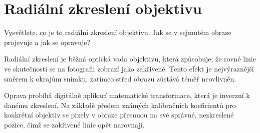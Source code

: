 \section{Radiální zkreslení objektivu}
Vysvětlete, co je to radiální zkreslení objektivu. Jak se v sejmutém obraze projevuje a jak se opravuje?

Radiální zkreslení je běžná optická vada objektivu, která způsobuje, že rovné linie ve skutečnosti se na fotografii 
zobrazí jako zakřivené. Tento efekt je nejvýraznější směrem k okrajům snímku, zatímco střed obrazu zůstává téměř 
neovlivněn.

Oprava probíhá digitálně aplikací matematické transformace, která je inverzní k danému zkreslení. Na základě předem 
známých kalibračních koeficientů pro konkrétní objektiv se pixely v obraze přesunou na své správné, nezkreslené pozice, 
čímž se zakřivené linie opět narovnají.